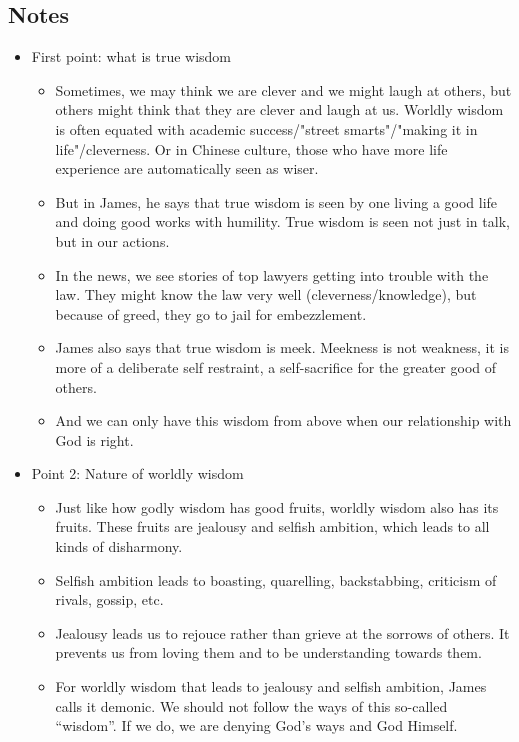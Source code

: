 \subsection*{Notes}
\begin{itemize}
  \item{First point: what is true wisdom
  \begin{itemize}
    \item Sometimes, we may think we are clever and we might laugh at others,
    but others might think that they are clever and laugh at us. Worldly
    wisdom is often equated with academic success/"street smarts"/"making it
    in life"/cleverness. Or in Chinese culture, those who have more life
    experience are automatically seen as wiser.
    \item But in James, he says that true wisdom is seen by one living a good
    life and doing good works with humility. True wisdom is seen not just in
    talk, but in our actions.
    \item In the news, we see stories of top lawyers getting into trouble
    with the law. They might know the law very well (cleverness/knowledge),
    but because of greed, they go to jail for embezzlement.
    \item James also says that true wisdom is meek. Meekness is not weakness,
    it is more of a deliberate self restraint, a self-sacrifice for the
    greater good of others.
    \item And we can only have this wisdom from above when our relationship
    with God is right.
  \end{itemize} }
  \item{Point 2: Nature of worldly wisdom
  \begin{itemize}
    \item Just like how godly wisdom has good fruits, worldly wisdom also has
    its fruits. These fruits are jealousy and selfish ambition, which leads
    to all kinds of disharmony.
    \item Selfish ambition leads to boasting, quarelling, backstabbing, criticism of rivals, gossip, etc.
    \item Jealousy leads us to rejouce rather than grieve at the sorrows of others. It prevents us from loving them and to be understanding towards them. 
    \item For worldly wisdom that leads to jealousy and selfish ambition, James calls it demonic. We should not follow the ways of this so-called ``wisdom''. If we do, we are denying God's ways and God Himself.

\end{itemize}}
\end{itemize}
